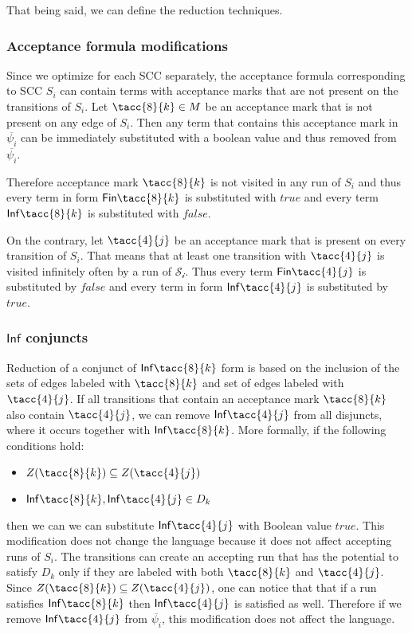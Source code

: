\documentclass[runningheads]{llncs}
\def\Inf{\ensuremath{\mathsf{Inf}}}
\def\Fin{\ensuremath{\mathsf{Fin}}}
\def\false{\mathit{false}}
\def\true{\mathit{true}}
\begin{document}
That being said, we can define the reduction techniques. 

\subsubsection{Acceptance formula modifications\\} 
\label{subsection:acc_modif}
Since we optimize for each SCC separately, the acceptance formula corresponding to SCC $S_{i}$ can contain terms with acceptance marks that are not present on the transitions of $S_{i}$.
Let $\tacc{8}{k} \in M$ be an acceptance mark that is not present on any edge of $S_{i}$. Then any term that contains this acceptance mark in $\overline{\psi_{i}}$ can be immediately substituted with a boolean value and thus removed from $\overline{\psi_{i}}$.
\medskip

Therefore acceptance mark $\tacc{8}{k}$ is not visited in any run of $S_{i}$ and thus every term in form $\Fin\tacc{8}{k}$ is substituted with $\true$ and every term $\Inf\tacc{8}{k}$ is substituted with $\false$.

On the contrary, let $\tacc{4}{j}$ be an acceptance mark that is present on every transition of $S_{i}$. That means that at least one transition with $\tacc{4}{j}$ is visited infinitely often by a run of $\mathcal{S_{i}}$. Thus every term $\Fin\tacc{4}{j}$ is substituted by $\false$ and every term in form $\Inf\tacc{4}{j}$ is substituted by $\true$. 

\subsubsection{$\Inf$ conjuncts\\}
\label{subsection:simpl_inf}
Reduction of a conjunct of $\Inf\tacc{8}{k}$ form  is based on the inclusion of the sets of edges labeled with $\tacc{8}{k}$ and set of edges labeled with $\tacc{4}{j}$. If all transitions that contain an acceptance mark $\tacc{8}{k}$ also contain $\tacc{4}{j}$, we can remove $\Inf\tacc{4}{j}$ from all disjuncts, where it occurs together with $\Inf\tacc{8}{k}$. 
More formally, if the following conditions hold:
\begin{itemize}
    \item $Z(\tacc{8}{k}) \subseteq Z(\tacc{4}{j})$
    \item $\Inf\tacc{8}{k}, \Inf\tacc{4}{j} \in D_{k}$
\end{itemize}
then we can we can substitute $\Inf\tacc{4}{j}$ with Boolean value $\true$. 
This modification does not change the language because it does not affect accepting runs of $S_{i}$. The transitions can create an accepting run that has the potential to satisfy $D_{k}$ only if they are labeled with both  $\tacc{8}{k}$  and $\tacc{4}{j}$. Since $Z(\tacc{8}{k}) \subseteq Z(\tacc{4}{j})$, one can notice that that if a run satisfies $\Inf\tacc{8}{k}$ then  $\Inf\tacc{4}{j}$ is satisfied as well. Therefore if we remove $\Inf \tacc{4}{j}$ from $\overline{\psi_{i}}$, this modification does not affect the language.
\end{document}
